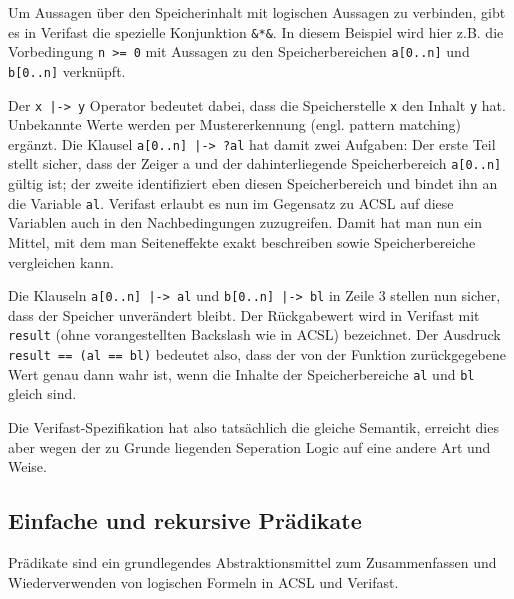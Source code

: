 Um Aussagen über den Speicherinhalt mit logischen Aussagen zu verbinden, gibt es in Verifast die spezielle 
Konjunktion \lstinline{&*&}. In diesem Beispiel wird hier z.B. die Vorbedingung \lstinline{n >= 0} mit Aussagen
zu den Speicherbereichen \lstinline{a[0..n]} und \lstinline{b[0..n]} verknüpft.

Der \lstinline{x |-> y} Operator bedeutet dabei, dass die Speicherstelle \lstinline{x} den Inhalt \lstinline{y} hat.
Unbekannte Werte werden per Mustererkennung (engl. pattern matching) ergänzt. Die Klausel
\lstinline{a[0..n] |-> ?al} hat damit zwei Aufgaben: Der erste Teil stellt sicher, dass der Zeiger a und
der dahinterliegende Speicherbereich \lstinline{a[0..n]} gültig ist; der zweite identifiziert eben diesen 
Speicherbereich und bindet ihn an die Variable \lstinline{al}.
Verifast erlaubt es nun im Gegensatz zu ACSL auf diese Variablen auch in den Nachbedingungen zuzugreifen. Damit
hat man nun ein Mittel, mit dem man Seiteneffekte exakt beschreiben sowie Speicherbereiche vergleichen kann.

Die Klauseln \lstinline{a[0..n] |-> al} und \lstinline{b[0..n] |-> bl} in Zeile 3 stellen nun sicher, dass der
Speicher unverändert bleibt. Der Rückgabewert wird in Verifast mit \lstinline{result} (ohne vorangestellten 
Backslash wie in ACSL) bezeichnet. Der Ausdruck \lstinline{result == (al == bl)} bedeutet also, dass der von der Funktion
zurückgegebene Wert genau dann wahr ist, wenn die Inhalte der Speicherbereiche \lstinline{al} und \lstinline{bl} 
gleich sind.

Die Verifast-Spezifikation hat also tatsächlich die gleiche Semantik, erreicht dies aber wegen der zu Grunde
liegenden Seperation Logic auf eine andere Art und Weise.


 
\subsection{Einfache und rekursive Prädikate}
\label{sec:design-by-contract:predicates}

Prädikate sind ein grundlegendes Abstraktionsmittel zum Zusammenfassen und Wiederverwenden von logischen 
Formeln in ACSL und Verifast.

